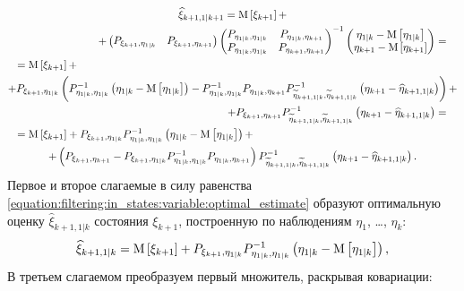 \begin{multline*} 
	\widehat{\xi}_{k+1, 1|k+1}
		= \expectation{\xi_{k+1}} + \\
		\shoveright{
			+ \begin{pmatrix} P_{\xi_{k+1}, \eta_{1|k}} & P_{\xi_{k+1}, \eta_{k+1}} \end{pmatrix}
			\begin{pmatrix}
				P_{\eta_{1|k}, \eta_{1|k}} & P_{\eta_{1|k}, \eta_{k+1}} \\
				P_{\eta_{1|k}, \eta_{1|k}} & P_{\eta_{k+1}, \eta_{k+1}}
			\end{pmatrix}^{-1}
			\begin{pmatrix}
				\eta_{1|k} - \expectation{\eta_{1|k}} \\
				\eta_{k+1} - \expectation{\eta_{k+1}}
			\end{pmatrix}
			=
		} \\
	\shoveleft{ = \expectation{\xi_{k+1}} + } \\
		+ P_{\xi_{k+1}, \eta_{1|k}} \left ( P_{\eta_{1|k},\eta_{1|k}}^{-1} \centered{\eta_{1|k}} - P_{\eta_{1|k},\eta_{1|k}}^{-1} P_{\eta_{1|k}, \eta_{k+1}} P_{\widetilde{\eta}_{k+1, 1|k}, \widetilde{\eta}_{k+1, 1|k}}^{-1} \left ( \eta_{k+1} - \widehat{\eta}_{k+1, 1|k} \right ) \right ) + \\
		\shoveright { + P_{\xi_{k+1}, \eta_{k+1}} P_{\widetilde{\eta}_{k+1, 1|k}, \widetilde{\eta}_{k+1, 1|k}}^{-1} \left ( \eta_{k+1} - \widehat{\eta}_{k+1, 1|k} \right ) = } \\
	\shoveleft{ = \expectation{\xi_{k+1}} + P_{\xi_{k+1}, \eta_{1|k}} P_{\eta_{1|k},\eta_{1|k}}^{-1} \centered{\eta_{1|k}} + } \\
		+ \left ( P_{\xi_{k+1}, \eta_{k+1}} - P_{\xi_{k+1}, \eta_{1|k}} P_{\eta_{1|k},\eta_{1|k}}^{-1} P_{\eta_{1|k}, \eta_{k+1}} \right ) P_{\widetilde{\eta}_{k+1, 1|k}, \widetilde{\eta}_{k+1, 1|k}}^{-1} \left ( \eta_{k+1} - \widehat{\eta}_{k+1, 1|k} \right )
	.
\end{multline*}
Первое и второе слагаемые в силу равенства \eqref{equation:filtering:in_states:variable:optimal_estimate} образуют оптимальную оценку $\widehat{\xi}_{k+1,1|k}$ состояния
$\xi_{k+1}$, построенную по наблюдениям $\eta_1$, \dots, $\eta_k$:
\begin{equation} \label{equation:filtering:in_states:process:state_prediction}
	\widehat{\xi}_{k+1,1|k} = \mathrm{M} \left [ \xi_{k+1} \right ] + P_{\xi_{k+1}, \eta_{1|k}} P_{\eta_{1|k},\eta_{1|k}}^{-1} \left ( \eta_{1|k} - \mathrm{M} \left [ \eta_{1|k} \right ] \right ) ,
\end{equation}
В третьем слагаемом преобразуем первый множитель, раскрывая ковариации:
